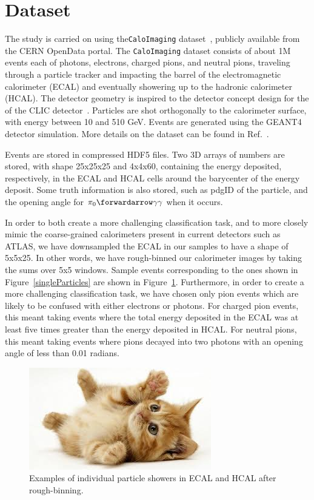 \documentclass{article}
\begin{document}
    \section*{Dataset}

    The study is carried on using the{\tt CaloImaging} dataset~\cite{caloimage}, publicly available from the CERN OpenData portal. The {\tt CaloImaging} dataset consists of about 1M events each of photons, electrons, charged pions, and neutral pions, traveling through a particle tracker and impacting the barrel of the electromagnetic calorimeter (ECAL) and eventually showering up to the hadronic calorimeter (HCAL). The detector geometry is inspired to the detector concept design for the of the CLIC detector~\cite{CLIC}. Particles are shot orthogonally to the calorimeter surface, with energy between 10 and 510 GeV. Events are generated using the GEANT4~\cite{GEANT} detector simulation. More details on the dataset can be found in Ref.~\cite{caloimage}. 

    Events are stored in compressed HDF5 files. Two 3D arrays of numbers are stored, with shape 25x25x25 and 4x4x60, containing the energy deposited, respectively, in the ECAL and HCAL cells around the barycenter of the energy deposit. Some truth information is also stored, such as pdgID of the particle, and the opening angle for $\pi_0 \forwardarrow \gamma\gamma$ when it occurs.

    In order to both create a more challenging classification task, and to more closely mimic the coarse-grained calorimeters present in current detectors such as ATLAS, we have downsampled the ECAL in our samples to have a shape of 5x5x25. In other words, we have rough-binned our calorimeter images by taking the sums over 5x5 windows. Sample events corresponding to the ones shown in Figure~\ref{singleParticles} are shown in Figure~\ref{singleParticlesRough}. Furthermore, in order to create a more challenging classification task, we have chosen only pion events which are likely to be confused with either electrons or photons. For charged pion events, this meant taking events where the total energy deposited in the ECAL was at least five times greater than the energy deposited in HCAL. For neutral pions, this meant taking events where pions decayed into two photons with an opening angle of less than 0.01 radians.

    \begin{figure}
        \begin{center}
            \includegraphics{images/cat-thumb.jpeg}
        \end{center}
        \caption{Examples of individual particle showers in ECAL and HCAL after rough-binning.}
        \label{singleParticlesRough}
    \end{figure}
\end{document}
